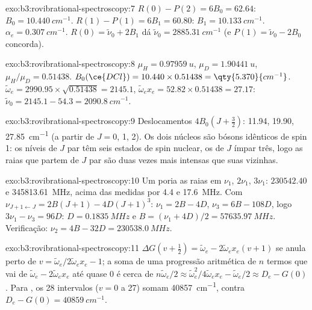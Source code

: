\begin{solution}{exo:b3:rovibrational-spectroscopy:7}
$R(0) - P(2) = 6B_0 = 62.64$: $B_0 = \qty{10.440}{cm^{-1}}$. $R(1) - P(1) = 6B_1 = 60.80$:
$B_1 = \qty{10.133}{cm^{-1}}$. $\alpha_e = \qty{0.307}{cm^{-1}}$. $R(0) = \tilde\nu_0 + 2B_1$ dá
$\tilde\nu_0 = \qty{2885.31}{cm^{-1}}$ (e $P(1) = \tilde\nu_0 - 2B_0$ concorda).
\end{solution}

\begin{solution}{exo:b3:rovibrational-spectroscopy:8}
$\mu_H = \qty{0.97959}{u}$, $\mu_D = \qty{1.90441}{u}$, $\mu_H/\mu_D = 0.51438$. $B_0(\ce{DCl})
= 10.440 \times 0.51438 = \qty{5.370}{cm^{-1}}$. $\tilde\omega_e = 2990.95 \times \sqrt{0.51438}
= 2145.1$, $\tilde\omega_ex_e = 52.82 \times 0.51438 = 27.17$: $\tilde\nu_0 = 2145.1 - 54.3 =
\qty{2090.8}{cm^{-1}}$.
\end{solution}

\begin{solution}{exo:b3:rovibrational-spectroscopy:9}
Deslocamentos $4B_0(J + \frac32)$: 11.94, 19.90, \qty{27.85}{cm^{-1}} (a partir de $J = 0$, 1, 2). Os
dois núcleos  são bósons idênticos de spin 1: os níveis de $J$ par têm seis
estados de spin nuclear, os de $J$ ímpar três, logo as raias que partem de $J$ par
são duas vezes mais intensas que suas vizinhas.
\end{solution}

\begin{solution}{exo:b3:rovibrational-spectroscopy:10}
Um  poria as raias em $\nu_1$, $2\nu_1$, $3\nu_1$: $230542.40$ e
\qty{345813.61}{MHz}, acima das medidas por 4.4 e \qty{17.6}{MHz}. Com
$\nu_{J+1\leftarrow J} = 2B(J+1) - 4D(J+1)^3$: $\nu_1 = 2B - 4D$, $\nu_3 = 6B - 108D$, logo
$3\nu_1 - \nu_3 = 96D$: $D = \qty{0.1835}{MHz}$ e $B = (\nu_1 + 4D)/2 =
\qty{57635.97}{MHz}$. Verificação: $\nu_2 = 4B - 32D = \qty{230538.0}{MHz}$.
\end{solution}

\begin{solution}{exo:b3:rovibrational-spectroscopy:11}
$\Delta G(v + \frac12) = \tilde\omega_e - 2\tilde\omega_ex_e(v+1)$ se anula perto de $v =
\tilde\omega_e/2\tilde\omega_ex_e - 1$; a soma de uma progressão aritmética de $n$ termos
que vai de $\tilde\omega_e - 2\tilde\omega_ex_e$ até quase 0 é cerca de $n\tilde\omega_e/2 \approx
\tilde\omega_e^2/4\tilde\omega_ex_e - \tilde\omega_e/2 \approx D_e - G(0)$. Para , os 28 intervalos
($v = 0$ a 27) somam \qty{40857}{cm^{-1}}, contra $D_e - G(0) = \qty{40859}{cm^{-1}}$.
\end{solution}

